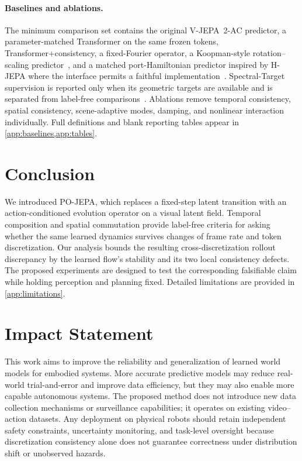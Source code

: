 \documentclass{article}
\theoremstyle{plain}
\theoremstyle{definition}
\theoremstyle{remark}
\newcommand{\POJEPA}{\textsc{PO-JEPA}}
\begin{document}
\paragraph{Baselines and ablations.}
The minimum comparison set contains the original V-JEPA~2-AC predictor, a parameter-matched Transformer on the same frozen tokens, Transformer+consistency, a fixed-Fourier operator, a Koopman-style rotation--scaling predictor~\citep{li2026koopman}, and a matched port-Hamiltonian predictor inspired by H-JEPA where the interface permits a faithful implementation~\citep{zoabi2026hjjepa}. Spectral-Target supervision is reported only when its geometric targets are available and is separated from label-free comparisons~\citep{zhu2026spectral}. Ablations remove temporal consistency, spatial consistency, scene-adaptive modes, damping, and nonlinear interaction individually. Full definitions and blank reporting tables appear in \cref{app:baselines,app:tables}.

\section{Conclusion}
We introduced \POJEPA{}, which replaces a fixed-step latent transition with an action-conditioned evolution operator on a visual latent field. Temporal composition and spatial commutation provide label-free criteria for asking whether the same learned dynamics survives changes of frame rate and token discretization. Our analysis bounds the resulting cross-discretization rollout discrepancy by the learned flow's stability and its two local consistency defects. The proposed experiments are designed to test the corresponding falsifiable claim while holding perception and planning fixed. Detailed limitations are provided in \cref{app:limitations}.

\section*{Impact Statement}
This work aims to improve the reliability and generalization of learned world models for embodied systems. More accurate predictive models may reduce real-world trial-and-error and improve data efficiency, but they may also enable more capable autonomous systems. The proposed method does not introduce new data collection mechanisms or surveillance capabilities; it operates on existing video--action datasets. Any deployment on physical robots should retain independent safety constraints, uncertainty monitoring, and task-level oversight because discretization consistency alone does not guarantee correctness under distribution shift or unobserved hazards.
\end{document}
